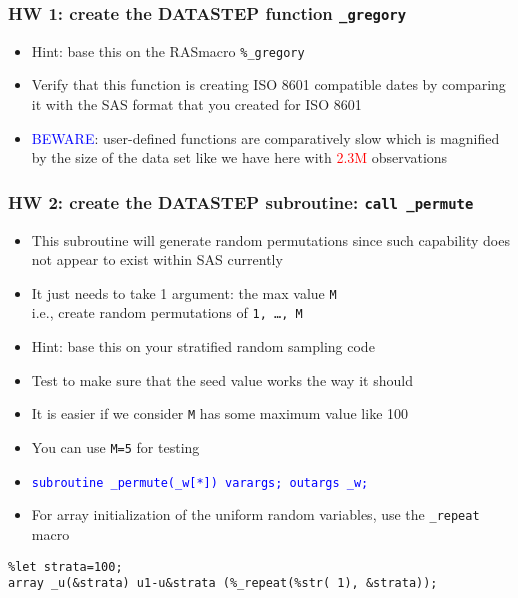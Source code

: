 \documentclass[11pt,pdftex,dvipsnames,usenames,helvetica]{beamer}
\begin{document}
\begin{frame}[fragile]
\frametitle{HW 1: create the DATASTEP function {\tt \_gregory}}
\begin{itemize}
\item Hint: base this on the RASmacro {\tt \%\_gregory}
\item Verify that this function is creating ISO 8601
compatible dates by comparing it with the SAS format
that you created for ISO 8601
\item \textcolor{blue}{BEWARE}: user-defined functions are
  comparatively slow which is magnified by the size of the data set
like we have here with \textcolor{red}{2.3M} observations
\end{itemize}
\end{frame}

\begin{frame}[fragile]
\frametitle{HW 2: create the DATASTEP subroutine: {\tt call \_permute}}
\begin{itemize}
\item This subroutine will generate random permutations
since such capability does not appear to exist within 
SAS currently
\item It just needs to take 1 argument: the max
value {\tt M}\\ i.e., create random permutations of 
{\tt 1, \dots, M}
\item Hint: base this on your stratified random sampling code
\item Test to make sure that the seed value works the way it should
\item It is easier if we consider {\tt M} has some maximum
value like 100
\item You can use {\tt M=5} for testing
\item \textcolor{blue}{\tt subroutine \_permute(\_w[*]) varargs; outargs \_w;} 
\item For array initialization of the uniform random variables, 
use the {\tt \_repeat} macro
\end{itemize}
\begin{verbatim}
%let strata=100;
array _u(&strata) u1-u&strata (%_repeat(%str( 1), &strata));
\end{verbatim}
\end{frame}
\end{document}

